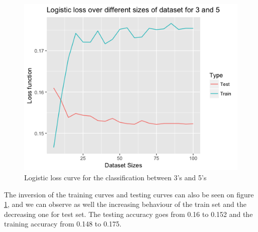 \documentclass[a4paper,11pt]{article}
\begin{document}
\begin{figure}[H]
\centering
\includegraphics[width=.6\textwidth]{3_5_loss}
\caption{Logistic loss curve for the classification between 3's and 5's}
\label{3_5_loss}
\end{figure}

The inversion of the training curves and testing curves can also be seen on figure \ref{3_5_loss}, and we can observe as well the increasing behaviour of the train set and the decreasing one for test set. The testing accuracy goes from 0.16 to 0.152 and the training accuracy from 0.148 to 0.175.
\end{document}
